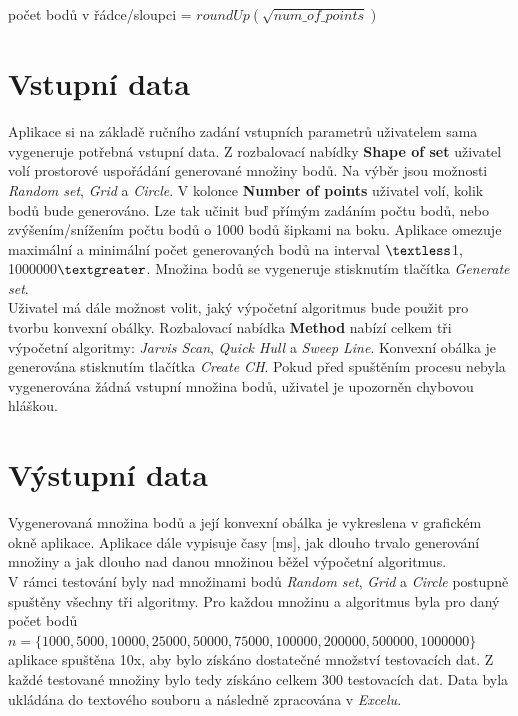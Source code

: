 \documentclass[a4paper, 12pt]{article}
\begin{document}
počet bodů v řádce/sloupci = $roundUp(\sqrt{num\_of\_points})$

\section{Vstupní data}
Aplikace si na základě ručního zadání vstupních parametrů uživatelem sama vygeneruje potřebná vstupní data. Z rozbalovací nabídky \textbf{Shape of set} uživatel volí prostorové uspořádání generované množiny bodů. Na výběr jsou možnosti \textit{Random set}, \textit{Grid} a \textit{Circle}. V kolonce \textbf{Number of points} uživatel volí, kolik bodů bude generováno. Lze tak učinit buď přímým zadáním počtu bodů, nebo zvýšením/snížením počtu bodů o 1000 bodů šipkami na boku. Aplikace omezuje maximální a minimální počet generovaných bodů na interval $\textless$1, 1000000$\textgreater$. Množina bodů se vygeneruje stisknutím tlačítka \textsl{Generate set}.\\

Uživatel má dále možnost volit, jaký výpočetní algoritmus bude použit pro tvorbu konvexní obálky. Rozbalovací nabídka \textbf{Method} nabízí celkem tři výpočetní algoritmy: \textit{Jarvis Scan}, \textit{Quick Hull} a \textit{Sweep Line}. Konvexní obálka je generována stisknutím tlačítka \textsl{Create CH}. Pokud před spuštěním procesu nebyla vygenerována žádná vstupní množina bodů, uživatel je upozorněn chybovou hláškou. 

\section{Výstupní data}
Vygenerovaná množina bodů a její konvexní obálka je vykreslena v grafickém okně aplikace. Aplikace dále vypisuje časy [ms], jak dlouho trvalo generování množiny a jak dlouho nad danou množinou běžel výpočetní algoritmus.\\

V rámci testování byly nad množinami bodů \textit{Random set}, \textit{Grid} a \textit{Circle} postupně spuštěny všechny tři algoritmy. Pro každou množinu a algoritmus byla pro daný počet bodů $n = \{1000, 5000, 10000, 25000, 50000, 75000, 100000, 200000, 500000, 1000000\}$ aplikace spuš\-tě\-na 10x, aby bylo získáno dostatečné množství testovacích dat. Z každé testované množiny bylo tedy získáno celkem 300 testovacích dat. Data byla ukládána do textového souboru a následně zpracována v \textit{Excelu}. \\
\end{document}
